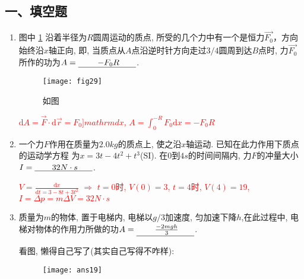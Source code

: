 \subsection*{一、填空题}

\begin{enumerate}
    \item 图中 \ref{Fig:29} 沿着半径为$R$圆周运动的质点, 所受的几个力中有一个是恒力$\vec{F_0}$，方向始终沿$x$轴正向, 
    即, 当质点从$A$点沿逆时针方向走过$3/4$圆周到达$B$点时, 力$\vec{F_0}$所作的功为$A=\anl{$-F_0R$}$.
    \begin{figure}[H]
        \centering
        \texttt{[image: fig29]}
            \caption{如图}\label{Fig:29}
    \end{figure}
    \begin{note}
        \textcolor{red}{$\mathrm{d}A=\vec{F}\cdot \mathrm{d}\vec{r}=F_0]mathrm{d}x$, $A = \displaystyle{\int_{0}^{-R}F_0\mathrm{d}x = -F_0R}$}
    \end{note}
    \item 一个力$F$作用在质量为$2.0 kg$的质点上, 使之沿$x$轴运动. 已知在此力作用下质点的运动学方程
    为$x=3t-4t^2+t^3$(SI). 在0到$4s$的时间间隔内, 力$F$的冲量大小$I=\anl{$32 N\cdot s$}$.
    \begin{note}
        \textcolor{red}{$V=\frac{\mathrm{d}x}{\mathrm{d}t=3-8t+3t^2}$ $\Longrightarrow$ $t=0$时, $V(0)=3$, $t=4$时, $V(4)=19$, $I=\Delta p = m\Delta V = 32 N\cdot s$}
    \end{note}
    \item  质量为$m$的物体, 置于电梯内, 电梯以$g/3$加速度, 匀加速下降$h$,在此过程中, 
    电梯对物体的作用力所做的功$A=\anl{$\frac{-2mgh}{3}$}$.
    \begin{note}
        看图, 懒得自己写了(其实自己写得不咋样):
    \end{note}
    \begin{figure}[H]
        \centering
        \texttt{[image: ans19]}
    \end{figure}
\end{enumerate}

